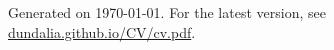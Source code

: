 \documentclass[11pt, a4paper]{russell}
\begin{document}
\makecvheader[C]

%  



% 
% 


%

\vspace*{\fill}
{\centering\footnotesize Generated on \today. For the latest version, see \href{https://dundalia.github.io/CV/cv.pdf}{dundalia.github.io/CV/cv.pdf}.\par}
\end{document}
